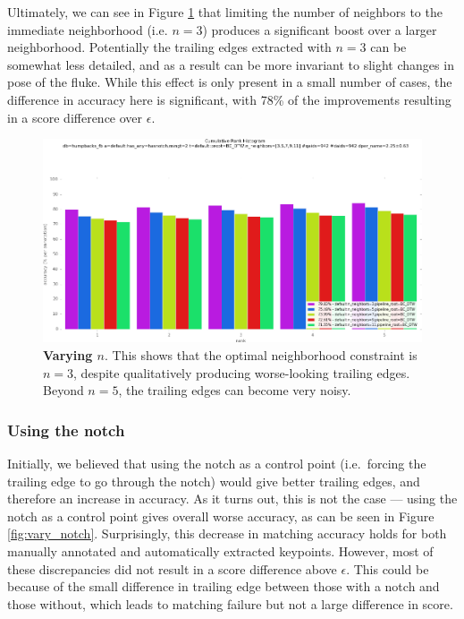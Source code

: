 Ultimately, we can see in Figure \ref{fig:vary_neighbors} that limiting the number of neighbors to the immediate neighborhood (i.e. $n = 3$) produces a significant boost over a larger neighborhood.
Potentially the trailing edges extracted with $n = 3$ can be somewhat less detailed, and as a result can be more invariant to slight changes in pose of the fluke.
While this effect is only present in a small number of cases, the difference in accuracy here is significant, with 78\% of the improvements resulting in a score difference over $\epsilon$.

\begin{figure}[t]%
\centering
\includegraphics[width=1\textwidth]{../images/results/vary_neighbors.png}
\caption{\textbf{Varying $n$}. This shows that the optimal neighborhood constraint is $n = 3$, despite qualitatively producing worse-looking trailing edges. Beyond $n = 5$, the trailing edges can become very noisy.}
\label{fig:vary_neighbors}
\end{figure}

\subsubsection{Using the notch}

Initially, we believed that using the notch as a control point (i.e.\ forcing the trailing edge to go through the notch) would give better trailing edges, and therefore an increase in accuracy.
As it turns out, this is not the case --- using the notch as a control point gives overall worse accuracy, as can be seen in Figure \ref{fig:vary_notch}.
Surprisingly, this decrease in matching accuracy holds for both manually annotated and automatically extracted keypoints.
However, most of these discrepancies did not result in a score difference above $\epsilon$.
This could be because of the small difference in trailing edge between those with a notch and those without, which leads to matching failure but not a large difference in score.

